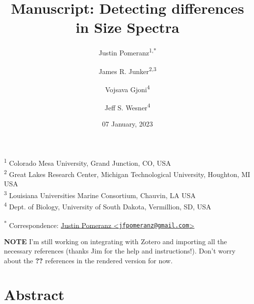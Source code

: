 \documentclass[
]{article}
\title{Manuscript: Detecting differences in Size Spectra}
\author{Justin Pomeranz\textsuperscript{1,*} \and James R.
Junker\textsuperscript{2,3} \and Vojsava
Gjoni\textsuperscript{4} \and Jeff S. Wesner\textsuperscript{4}}
\date{07 January, 2023}
\begin{document}
\maketitle

{
\setcounter{tocdepth}{2}
\tableofcontents
}
\textsuperscript{1} Colorado Mesa University, Grand Junction, CO, USA\\
\textsuperscript{2} Great Lakes Research Center, Michigan Technological
University, Houghton, MI USA\\
\textsuperscript{3} Louisiana Universities Marine Consortium, Chauvin,
LA USA\\
\textsuperscript{4} Dept. of Biology, University of South Dakota,
Vermillion, SD, USA

\textsuperscript{*} Correspondence:
\href{mailto:jfpomeranz@gmail.com}{Justin Pomeranz
\textless{}\href{mailto:jfpomeranz@gmail.com}{\nolinkurl{jfpomeranz@gmail.com}}\textgreater{}}

\textbf{NOTE} I'm still working on integrating with Zotero and importing
all the necessary references (thanks Jim for the help and
instructions!). Don't worry about the \textbf{??} references in the
rendered version for now.

\hypertarget{abstract}{%
\section{Abstract}\label{abstract}}
\end{document}
